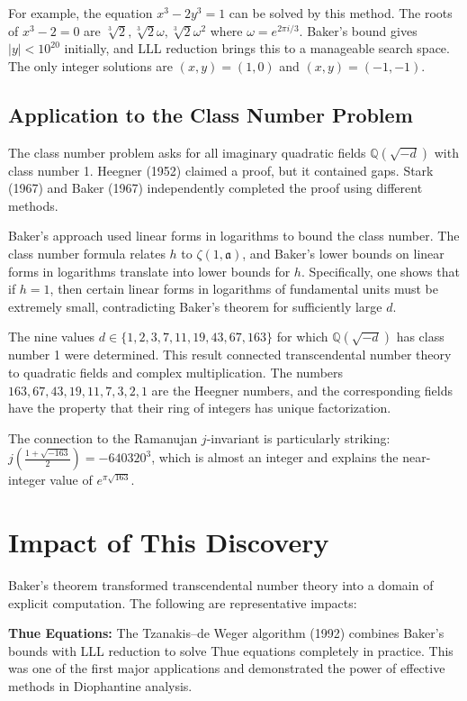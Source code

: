 For example, the equation $x^3 - 2y^3 = 1$ can be solved by this method. The roots of $x^3 - 2 = 0$ are $\sqrt[3]{2}, \sqrt[3]{2}\omega, \sqrt[3]{2}\omega^2$ where $\omega = e^{2\pi i/3}$. Baker's bound gives $|y| < 10^{20}$ initially, and LLL reduction brings this to a manageable search space. The only integer solutions are $(x,y) = (1,0)$ and $(x,y) = (-1, -1)$.

\subsection*{Application to the Class Number Problem}

The class number problem asks for all imaginary quadratic fields $\mathbb{Q}(\sqrt{-d})$ with class number 1. Heegner (1952) claimed a proof, but it contained gaps. Stark (1967) and Baker (1967) independently completed the proof using different methods.

Baker's approach used linear forms in logarithms to bound the class number. The class number formula relates $h$ to $\zeta(1, \mathfrak{a})$, and Baker's lower bounds on linear forms in logarithms translate into lower bounds for $h$. Specifically, one shows that if $h = 1$, then certain linear forms in logarithms of fundamental units must be extremely small, contradicting Baker's theorem for sufficiently large $d$.

The nine values $d \in \{1, 2, 3, 7, 11, 19, 43, 67, 163\}$ for which $\mathbb{Q}(\sqrt{-d})$ has class number 1 were determined. This result connected transcendental number theory to quadratic fields and complex multiplication. The numbers $163, 67, 43, 19, 11, 7, 3, 2, 1$ are the Heegner numbers, and the corresponding fields have the property that their ring of integers has unique factorization.

The connection to the Ramanujan $j$-invariant is particularly striking: $j\left(\frac{1 + \sqrt{-163}}{2}\right) = -640320^3$, which is almost an integer and explains the near-integer value of $e^{\pi\sqrt{163}}$.

\section{Impact of This Discovery}

Baker's theorem transformed transcendental number theory into a domain of explicit computation. The following are representative impacts:

\textbf{Thue Equations:} The Tzanakis--de Weger algorithm (1992) combines Baker's bounds with LLL reduction to solve Thue equations completely in practice. This was one of the first major applications and demonstrated the power of effective methods in Diophantine analysis.

